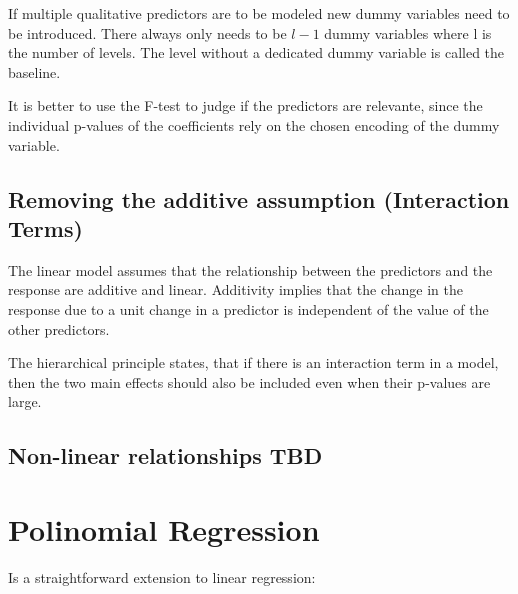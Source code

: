 \documentclass[../Main.tex]{subfiles}
\begin{document}
If multiple qualitative predictors are to be modeled new dummy variables need to be introduced.
There always only needs to be \(l-1\) dummy variables where l is the number of levels. The level
without a dedicated dummy variable is called the baseline.

It is better to use the F-test to judge if the predictors are relevante,
since the individual p-values of the coefficients rely on the chosen encoding of the dummy variable. 

\subsection{Removing the additive assumption (Interaction Terms)}
The linear model assumes that the relationship between the predictors and the response are additive and linear.
Additivity implies that the change in the response due to a unit change in a predictor is independent of the value
of the other predictors.


The hierarchical principle states, that if there is an interaction 
term in a model, then the two main effects should also be 
included even when their p-values are large.

\subsection{Non-linear relationships TBD}

\section{Polinomial Regression}
Is a straightforward extension to 
linear regression:
\end{document}
